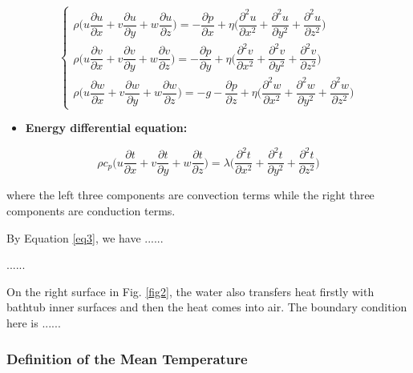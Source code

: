\documentclass{mcmthesis}
\begin{document}
\begin{equation} \label{eq2}
\left\{
\begin{array}{l} \!\!
\rho \Big(u \dfrac{\partial u}{\partial x} + v \dfrac{\partial u}{\partial y} + w\dfrac{\partial u}{\partial z} \Big) = -\dfrac{\partial p}{\partial x} + \eta \Big(\dfrac{\partial^2 u}{\partial x^2} + \dfrac{\partial^2 u}{\partial y^2} + \dfrac{\partial^2 u}{\partial z^2} \Big) \\[0.3cm]
\rho \Big(u \dfrac{\partial v}{\partial x} + v \dfrac{\partial v}{\partial y} + w\dfrac{\partial v}{\partial z} \Big) = -\dfrac{\partial p}{\partial y} + \eta \Big(\dfrac{\partial^2 v}{\partial x^2} + \dfrac{\partial^2 v}{\partial y^2} + \dfrac{\partial^2 v}{\partial z^2} \Big) \\[0.3cm]
\rho \Big(u \dfrac{\partial w}{\partial x} + v \dfrac{\partial w}{\partial y} + w\dfrac{\partial w}{\partial z} \Big) = -g-\dfrac{\partial p}{\partial z} + \eta \Big(\dfrac{\partial^2 w}{\partial x^2} + \dfrac{\partial^2 w}{\partial y^2} + \dfrac{\partial^2 w}{\partial z^2} \Big)  
\end{array}
\right.
\end{equation}

\begin{itemize}
\item {\bf Energy differential equation:}
\end{itemize}

\begin{equation} \label{eq3}
\rho c_p \Big( u\frac{\partial t}{\partial x} + v\frac{\partial t}{\partial y} + w\frac{\partial t}{\partial z} \Big) = \lambda \Big(\frac{\partial^2 t}{\partial x^2} + \frac{\partial^2 t}{\partial y^2} + \frac{\partial^2 t}{\partial z^2} \Big)
\end{equation}

\noindent where the left three components are convection terms while the right three components are conduction terms.

By Equation \eqref{eq3}, we have ......

......

On the right surface in Fig. \ref{fig2}, the water also transfers heat firstly with bathtub inner surfaces and then the heat comes into air. The boundary condition here is ......

\subsubsection{Definition of the Mean Temperature}
\end{document}
